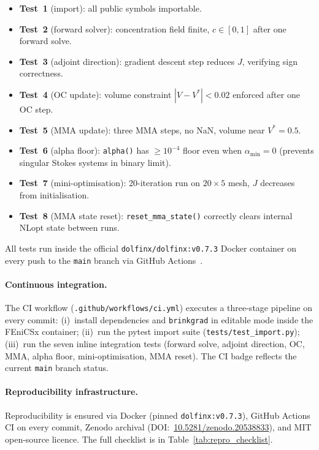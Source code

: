 \begin{itemize}\itemsep2pt
    \item \textbf{Test~1} (import): all public symbols importable.
    \item \textbf{Test~2} (forward solver): concentration field
          finite, $c\in[0,1]$ after one forward solve.
    \item \textbf{Test~3} (adjoint direction): gradient descent
          step reduces $J$, verifying sign correctness.
    \item \textbf{Test~4} (OC update): volume constraint
          $|V-V^*|<0.02$ enforced after one OC step.
    \item \textbf{Test~5} (MMA update): three MMA steps,
          no NaN, volume near $V^*=0.5$.
    \item \textbf{Test~6} (alpha floor): \texttt{alpha()} has
          $\geq10^{-4}$ floor even when $\alpha_{\min}=0$
          (prevents singular Stokes systems in binary limit).
    \item \textbf{Test~7} (mini-optimisation): 20-iteration run
          on $20\times5$ mesh, $J$ decreases from initialisation.
    \item \textbf{Test~8} (MMA state reset): \texttt{reset\_mma\_state()}
          correctly clears internal NLopt state between runs.
\end{itemize}

\noindent
All tests run inside the official \texttt{dolfinx/dolfinx:v0.7.3}
Docker container on every push to the \texttt{main} branch
via GitHub Actions~\cite{GitHubActions2024}.

\paragraph{Continuous integration.}
The CI workflow (\texttt{.github/workflows/ci.yml}) executes
a three-stage pipeline on every commit:
(i)~install dependencies and \texttt{brinkgrad} in editable mode
inside the FEniCSx container;
(ii)~run the pytest import suite (\texttt{tests/test\_import.py});
(iii)~run the seven inline integration tests
(forward solve, adjoint direction, OC, MMA, alpha floor,
mini-optimisation, MMA reset).
The CI badge reflects the current \texttt{main} branch status.

\paragraph{Reproducibility infrastructure.}
Reproducibility is ensured via Docker (pinned \texttt{dolfinx:v0.7.3}),
GitHub Actions CI on every commit, Zenodo archival
(DOI:~\href{https://doi.org/10.5281/zenodo.20538833}{10.5281/zenodo.20538833}),
and MIT open-source licence.
The full checklist is in Table~\ref{tab:repro_checklist}.

